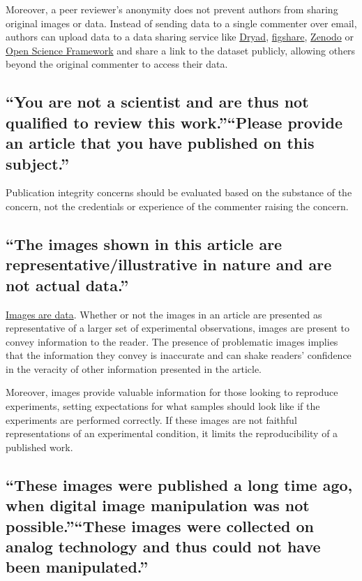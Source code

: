 \documentclass[letterpaper, 12pt]{article}
\begin{document}
Moreover, a peer reviewer's anonymity does not prevent authors from sharing original images or data. Instead of sending data to a single commenter over email, authors can upload data to a data sharing service like \href{https://datadryad.org/stash}{Dryad}, \href{https://figshare.com/}{figshare}, \href{https://zenodo.org/}{Zenodo} or \href{https://osf.io/}{Open Science Framework} and share a link to the dataset publicly, allowing others beyond the original commenter to access their data.

\subsection*{``You are not a scientist and are thus not qualified to review this work.''\newline``Please provide an article that you have published on this subject.''}

Publication integrity concerns should be evaluated based on the substance of the concern, not the credentials or experience of the commenter raising the concern.

\subsection*{``The images shown in this article are representative/illustrative in nature and are not actual data.''}

\href{https://doi.org/10.1007/978-1-62703-056-4_1}{Images are data}. Whether or not the images in an article are presented as representative of a larger set of experimental observations, images are present to convey information to the reader. The presence of problematic images implies that the information they convey is inaccurate and can shake readers' confidence in the veracity of other information presented in the article. 

Moreover, images provide valuable information for those looking to reproduce experiments, setting expectations for what samples should look like if the experiments are performed correctly. If these images are not faithful representations of an experimental condition, it limits the reproducibility of a published work.

\subsection*{``These images were published a long time ago, when digital image manipulation was not possible.''\newline``These images were collected on analog technology and thus could not have been manipulated.''}
\end{document}
